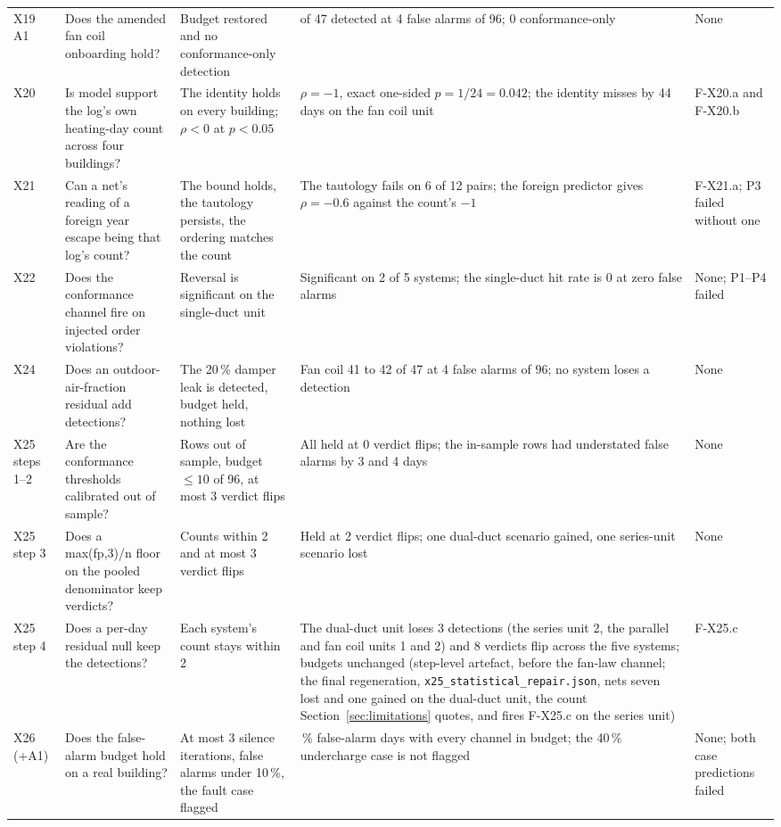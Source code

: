 \documentclass[11pt,letterpaper]{article}
\begin{document}
{\begin{longtable}{@{}>{\raggedright\arraybackslash}p{0.9cm}>{\raggedright\arraybackslash}p{4.3cm}>{\raggedright\arraybackslash}p{3.2cm}>{\raggedright\arraybackslash}p{4.2cm}>{\raggedright\arraybackslash}p{2.4cm}@{}}
X19 A1 & Does the amended fan coil onboarding hold? & Budget restored and no conformance-only detection & 41 of 47 detected at 4 false alarms of 96; 0 conformance-only & None \\
X20 & Is model support the log's own heating-day count across four buildings? & The identity holds on every building; $\rho < 0$ at $p < 0.05$ & $\rho = -1$, exact one-sided $p = 1/24 = 0.042$; the identity misses by 44 days on the fan coil unit & F-X20.a and F-X20.b \\
X21 & Can a net's reading of a foreign year escape being that log's count? & The bound holds, the tautology persists, the ordering matches the count & The tautology fails on 6 of 12 pairs; the foreign predictor gives $\rho = -0.6$ against the count's $-1$ & F-X21.a; P3 failed without one \\
X22 & Does the conformance channel fire on injected order violations? & Reversal is significant on the single-duct unit & Significant on 2 of 5 systems; the single-duct hit rate is 0 at zero false alarms & None; P1--P4 failed \\
X24 & Does an outdoor-air-fraction residual add detections? & The 20\,\% damper leak is detected, budget held, nothing lost & Fan coil 41 to 42 of 47 at 4 false alarms of 96; no system loses a detection & None \\
X25 steps 1--2 & Are the conformance thresholds calibrated out of sample? & Rows out of sample, budget $\le 10$ of 96, at most 3 verdict flips & All held at 0 verdict flips; the in-sample rows had understated false alarms by 3 and 4 days & None \\
X25 step 3 & Does a max(fp,3)/n floor on the pooled denominator keep verdicts? & Counts within 2 and at most 3 verdict flips & Held at 2 verdict flips; one dual-duct scenario gained, one series-unit scenario lost & None \\
X25 step 4 & Does a per-day residual null keep the detections? & Each system's count stays within 2 & The dual-duct unit loses 3 detections (the series unit 2, the parallel and fan coil units 1 and 2) and 8 verdicts flip across the five systems; budgets unchanged (step-level artefact, before the fan-law channel; the final regeneration, \texttt{x25\_statistical\_repair.json}, nets seven lost and one gained on the dual-duct unit, the count Section~\ref{sec:limitations} quotes, and fires F-X25.c on the series unit) & F-X25.c \\
X26 (+A1) & Does the false-alarm budget hold on a real building? & At most 3 silence iterations, false alarms under 10\,\%, the fault case flagged & 6.1\,\% false-alarm days with every channel in budget; the 40\,\% undercharge case is not flagged & None; both case predictions failed \\

\end{longtable}}
\end{document}
